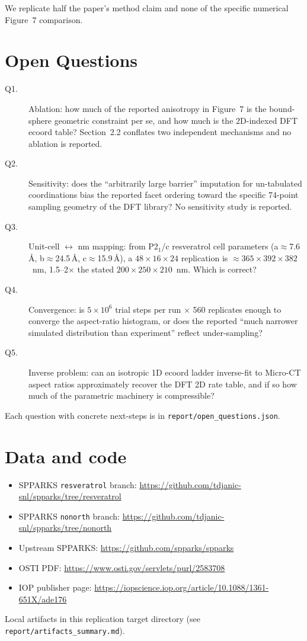 \documentclass[11pt]{article}
\begin{document}
We replicate half the paper's method claim and none of the specific numerical Figure~7 comparison.

\section{Open Questions}

\begin{description}
  \item[Q1.] Ablation: how much of the reported anisotropy in Figure~7 is the bound-sphere geometric constraint per se, and how much is the 2D-indexed DFT ecoord table? Section~2.2 conflates two independent mechanisms and no ablation is reported.

  \item[Q2.] Sensitivity: does the ``arbitrarily large barrier'' imputation for un-tabulated coordinations bias the reported facet ordering toward the specific 74-point sampling geometry of the DFT library? No sensitivity study is reported.

  \item[Q3.] Unit-cell $\leftrightarrow$ nm mapping: from P2$_1$/c resveratrol cell parameters (a$\approx$7.6\,\AA, b$\approx$24.5\,\AA, c$\approx$15.9\,\AA), a $48\!\times\!16\!\times\!24$ replication is $\approx 365 \times 392 \times 382$~nm, 1.5--2$\times$ the stated $200\!\times\!250\!\times\!210$~nm. Which is correct?

  \item[Q4.] Convergence: is $5\!\times\!10^6$ trial steps per run $\times$ 560 replicates enough to converge the aspect-ratio histogram, or does the reported ``much narrower simulated distribution than experiment'' reflect under-sampling?

  \item[Q5.] Inverse problem: can an isotropic 1D ecoord ladder inverse-fit to Micro-CT aspect ratios approximately recover the DFT 2D rate table, and if so how much of the parametric machinery is compressible?
\end{description}

Each question with concrete next-steps is in \texttt{report/open\_questions.json}.

\section{Data and code}

\begin{itemize}
  \item SPPARKS \texttt{resveratrol} branch: \url{https://github.com/tdjanic-snl/spparks/tree/resveratrol}
  \item SPPARKS \texttt{nonorth} branch: \url{https://github.com/tdjanic-snl/spparks/tree/nonorth}
  \item Upstream SPPARKS: \url{https://github.com/spparks/spparks}
  \item OSTI PDF: \url{https://www.osti.gov/servlets/purl/2583708}
  \item IOP publisher page: \url{https://iopscience.iop.org/article/10.1088/1361-651X/ade176}
\end{itemize}

Local artifacts in this replication target directory (see \texttt{report/artifacts\_summary.md}).
\end{document}
